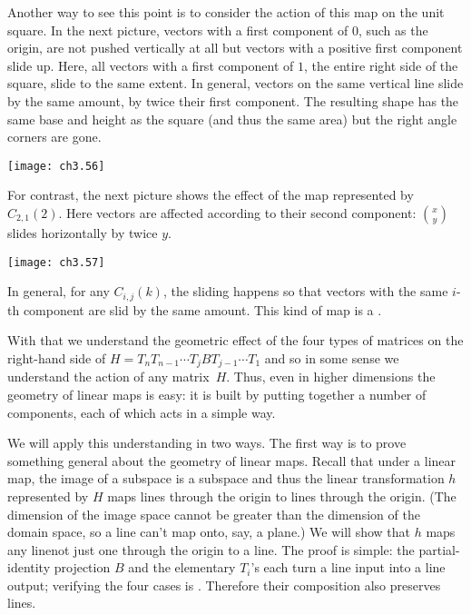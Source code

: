 Another way to see this point is to consider the action of this map 
on the unit square.
In the next picture,
vectors with a first component of $0$, such as the origin, are not pushed 
vertically at all but vectors with a positive first component slide up.
Here, all vectors with a first component of $1$, the entire 
right side of the square, slide to the same extent.
In general, vectors on the same vertical line slide by the same amount,
by twice their first component.
The resulting shape has the same base and height as the square
(and thus the same area) but the right angle corners are gone.
\begin{center}
  \texttt{[image: ch3.56]}
\end{center}

For contrast, the next picture shows the effect of the map represented by 
$C_{2,1}(2)$.
Here vectors are affected according to their  
second component:
$\binom{x}{y}$ slides horizontally by twice $y$.
\begin{center}
  \texttt{[image: ch3.57]}
\end{center}
In general, for any $C_{i,j}(k)$, the
sliding happens so that vectors with the same $i$-th component
are slid by the same amount.
This kind of map is a 
.

With that we understand the geometric effect of the four types 
of matrices on the right-hand side of
$H=T_nT_{n-1}\cdots T_jBT_{j-1}\cdots T_1$
and so in some sense we understand  
the action of any matrix~$H$.
Thus, even in higher dimensions the geometry of linear maps is easy: it 
is built by putting
together a number of components, each of which acts in a simple way.

We will apply this understanding in two ways.
The first way is to prove something general about 
the geometry of linear maps. 
Recall that under a linear map, the image of a subspace is a subspace
and thus the linear transformation $h$ represented by $H$ maps lines 
through the origin to lines through the origin.
(The dimension of the image space cannot be greater than 
the dimension of the domain space, so a line can't map onto, say, a plane.)
We will show that $h$ maps any line\Dash not just one through the origin\Dash 
to a line.
The proof is simple:
the partial-identity projection $B$ and the elementary $T_i$'s
each turn a line input into a line output; 
verifying the four cases is .
Therefore their composition also preserves lines.

